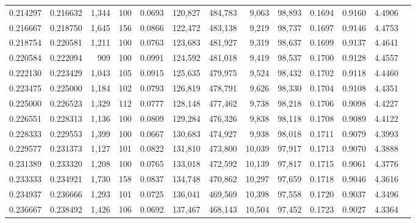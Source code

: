 \begin{tabular}{rrrrrrrrrrrrr}
0.214297 & 0.216632 &  1,344 &   100 &                                     0.0693 & 120,827 & 484,783 &   9,063 &  98,893 & 0.1694 & 0.9160 & 4.4906 \\
0.216667 & 0.218750 &  1,645 &   156 &                                     0.0866 & 122,472 & 483,138 &   9,219 &  98,737 & 0.1697 & 0.9146 & 4.4753 \\
0.218754 & 0.220581 &  1,211 &   100 &                                     0.0763 & 123,683 & 481,927 &   9,319 &  98,637 & 0.1699 & 0.9137 & 4.4641 \\
0.220584 & 0.222094 &    909 &   100 &                                     0.0991 & 124,592 & 481,018 &   9,419 &  98,537 & 0.1700 & 0.9128 & 4.4557 \\
0.222130 & 0.223429 &  1,043 &   105 &                                     0.0915 & 125,635 & 479,975 &   9,524 &  98,432 & 0.1702 & 0.9118 & 4.4460 \\
0.223475 & 0.225000 &  1,184 &   102 &                                     0.0793 & 126,819 & 478,791 &   9,626 &  98,330 & 0.1704 & 0.9108 & 4.4351 \\
0.225000 & 0.226523 &  1,329 &   112 &                                     0.0777 & 128,148 & 477,462 &   9,738 &  98,218 & 0.1706 & 0.9098 & 4.4227 \\
0.226551 & 0.228313 &  1,136 &   100 &                                     0.0809 & 129,284 & 476,326 &   9,838 &  98,118 & 0.1708 & 0.9089 & 4.4122 \\
0.228333 & 0.229553 &  1,399 &   100 &                                     0.0667 & 130,683 & 474,927 &   9,938 &  98,018 & 0.1711 & 0.9079 & 4.3993 \\
0.229577 & 0.231373 &  1,127 &   101 &                                     0.0822 & 131,810 & 473,800 &  10,039 &  97,917 & 0.1713 & 0.9070 & 4.3888 \\
0.231389 & 0.233320 &  1,208 &   100 &                                     0.0765 & 133,018 & 472,592 &  10,139 &  97,817 & 0.1715 & 0.9061 & 4.3776 \\
0.233333 & 0.234921 &  1,730 &   158 &                                     0.0837 & 134,748 & 470,862 &  10,297 &  97,659 & 0.1718 & 0.9046 & 4.3616 \\
0.234937 & 0.236666 &  1,293 &   101 &                                     0.0725 & 136,041 & 469,569 &  10,398 &  97,558 & 0.1720 & 0.9037 & 4.3496 \\
0.236667 & 0.238492 &  1,426 &   106 &                                     0.0692 & 137,467 & 468,143 &  10,504 &  97,452 & 0.1723 & 0.9027 & 4.3364 \\

\end{tabular}
